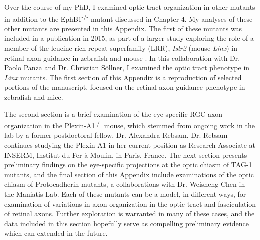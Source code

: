 Over the course of my PhD, I examined optic tract organization in other mutants in addition to the EphB1\textsuperscript{-/-} mutant discussed in Chapter 4.
My analyses of these other mutants are presented in this Appendix.
The first of these mutants was included in a publication in 2015, as part of a larger study exploring the role of a member of the leucine-rich repeat superfamily (LRR), \emph{Islr2} (mouse \emph{Linx}) in retinal axon guidance in zebrafish and mouse \cite{panza2015lrr}.
In this collaboration with Dr. Paolo Panza and Dr. Christian S\"ollner, I examined the optic tract phenotype in \emph{Linx} mutants.
The first section of this Appendix is a reproduction of selected portions of the manuscript, focused on the retinal axon guidance phenotype in zebrafish and mice.

The second section is a brief examination of the eye-specific RGC axon organization in the Plexin-A1\textsuperscript{-/-} mouse, which stemmed from ongoing work in the lab by a former postdoctoral fellow, Dr. Alexandra Rebsam.
Dr. Rebsam continues studying the Plexin-A1 in her current position as Research Associate at INSERM, Institut du Fer \`a Moulin, in Paris, France.
The next section presents preliminary findings on the eye-specific projections at the optic chiasm of TAG-1 mutants, and the final section of this Appendix include examinations of the optic chiasm of Protocadherin mutants, a collaborations with Dr. Weisheng Chen in the Maniatis Lab.
Each of these mutants can be a model, in different ways, for examination of variations in axon organization in the optic tract and fasciculation of retinal axons.
Further exploration is warranted in many of these cases, and the data included in this section hopefully serve as compelling preliminary evidence which can extended in the future.